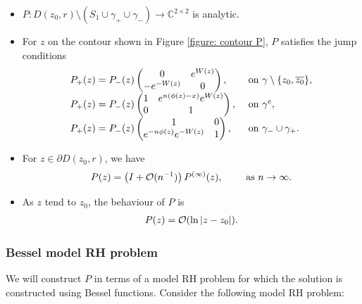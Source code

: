 \documentclass[11pt,fleqn]{article}
\numberwithin{equation}{section}
\def\bigO{{\cal O}}
\begin{document}
\begin{itemize}
\item[(a)] $P : D(z_{0},r) \setminus (S_{1} \cup \gamma_{+} \cup \gamma_{-}) \to \mathbb{C}^{2\times 2}$ is analytic.
\item[(b)] For $z$ on the contour shown in Figure \ref{figure: contour P}, $P$ satisfies the jump conditions
\begin{equation}\label{jumps P}
\begin{array}{l l}
P_{+}(z) = P_{-}(z) \begin{pmatrix}
0 & e^{W(z)} \\ -e^{-W(z)} & 0
\end{pmatrix}, & \mbox{ on } \gamma\setminus \{z_{0},\overline{z_{0}}\}, \\

P_{+}(z) = P_{-}(z) \begin{pmatrix}
 1 & e^{n(\phi(z)-x)}e^{W(z)} \\
 0 & 1
\end{pmatrix}, & \mbox{ on } \gamma^{c}, \\

P_{+}(z) = P_{-}(z) \begin{pmatrix}
 1 & 0  \\ e^{-n\phi(z)}e^{-W(z)} & 1
\end{pmatrix}, & \mbox{ on } \gamma_{-} \cup \gamma_{+}. \\
\end{array}
\end{equation}
\item[(c)] For $z \in \partial D (z_{0},r)$, we have
\begin{equation}\label{matching P z0} P(z) = \left(I + \bigO(n^{-1})\right) P^{(\infty)}(z),\qquad \mbox{ as $n \to \infty$.}
\end{equation}
\item[(d)] As $z$ tend to $z_{0}$, the behaviour of $P$ is
\begin{equation}\label{P local}
\begin{array}{l l}
P(z) = \bigO(\ln|z-z_0|).
\end{array}
\end{equation}
\end{itemize}


\subsubsection{Bessel model RH problem}

We will construct $P$ in terms of a model RH problem for which the solution is constructed using Bessel functions.
Consider the following model RH problem:
\end{document}
